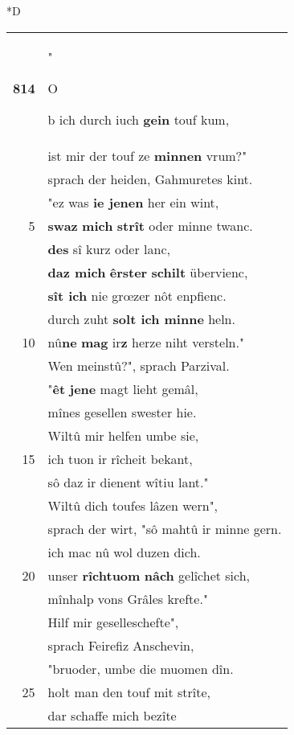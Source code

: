 \documentclass[8pt,a4paper,notitlepage]{article}
\begin{document}
\begin{table}[ht]
\begin{minipage}[t]{0.5\linewidth}
\small
\begin{center}*D
\end{center}
\begin{tabular}{rl}
\textbf{814} & "\begin{large}O\end{large}b ich durch iuch \textbf{gein} touf kum,\\ 
 & ist mir der touf ze \textbf{minnen} vrum?"\\ 
 & sprach der heiden, Gahmuretes kint.\\ 
 & "ez was \textbf{ie jenen} her ein wint,\\ 
5 & \textbf{swaz} \textbf{mich} \textbf{strît} oder minne twanc.\\ 
 & \textbf{des} sî kurz oder lanc,\\ 
 & \textbf{daz mich} \textbf{êrster} \textbf{schilt} übervienc,\\ 
 & \textbf{sît ich} nie grœzer nôt enpfienc.\\ 
 & durch zuht \textbf{solt ich minne} heln.\\ 
10 & nû\textbf{ne} \textbf{mag} ir\textbf{z} herze niht versteln."\\ 
 & Wen meinstû?", sprach Parzival.\\ 
 & "\textbf{êt} \textbf{jene} magt lieht gemâl,\\ 
 & mînes gesellen swester hie.\\ 
 & Wiltû mir helfen umbe sie,\\ 
15 & ich tuon ir rîcheit bekant,\\ 
 & sô daz ir dienent wîtiu lant."\\ 
 & Wiltû dich toufes lâzen wern",\\ 
 & sprach der wirt, "sô mahtû ir minne gern.\\ 
 & ich mac nû wol duzen dich.\\ 
20 & unser \textbf{rîchtuom} \textbf{nâch} gelîchet sich,\\ 
 & mînhalp vons Grâles krefte."\\ 
 & Hilf mir geselleschefte",\\ 
 & sprach Feirefiz Anschevin,\\ 
 & "bruoder, umbe die muomen dîn.\\ 
25 & holt man den touf mit strîte,\\ 
 & dar schaffe mich bezîte\\ 

\end{tabular}
\end{minipage}
\end{table}
\end{document}
